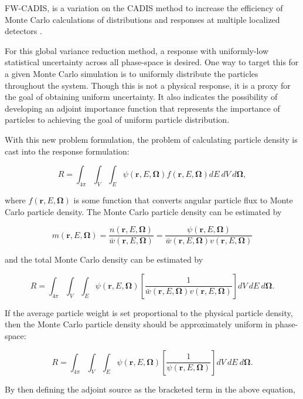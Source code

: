 \documentclass{article} %
\newcommand{\bo}{\mathbf\Omega}
\newcommand{\vecr}{\textbf{r}}
\newcommand{\fwc}{\mbox{FW-CADIS}}
\begin{document}
\fwc, is a variation on the CADIS method to increase the efficiency of Monte
Carlo calculations of distributions and responses at multiple localized
detectors \cite{fwcadis}.

For this global variance reduction method, a response with uniformly-low
statistical uncertainty across all phase-space is desired. One way to target
this for a given Monte Carlo simulation is to uniformly distribute the
particles throughout the system. Though this is not a physical response, it is
a proxy for the goal of obtaining uniform uncertainty. It also indicates the
possibility of developing an adjoint importance function that represents the
importance of particles to achieving the goal of uniform particle distribution.

With this new problem formulation, the problem of calculating particle density
is cast into the response formulation:

\begin{equation}
R = \int_{4\pi}\int_{V}\int_{E}\psi(\vecr,E,\bo)f(\vecr,E,\bo)dE\ dV\ d\bo,
\end{equation}

\noindent where $f(\vecr,E,\bo)$ is some function that converts angular
particle flux to Monte Carlo particle density. The Monte Carlo particle 
density can be estimated by

\begin{equation}
m(\vecr,E,\bo) = \frac{n(\vecr,E,\bo)}{\bar{w}(\vecr,E,\bo)} 
= \frac{\psi(\vecr,E,\bo)}{\bar{w}(\vecr,E,\bo)v(\vecr,E,\bo)}
\end{equation}

\noindent and the total Monte Carlo density can be estimated by

\begin{equation}
R = \int_{4\pi}\int_{V}\int_{E}\psi(\vecr,E,\bo)
\left[\frac{1}{\bar{w}(\vecr,E,\bo)v(\vecr,E,\bo)}\right]dV\ dE\ d\bo.
\label{eq:fwcadis_r}
\end{equation}

If the average particle weight is set proportional to the physical particle
density, then the Monte Carlo particle density should be approximately uniform
in phase-space:

\begin{equation}
R = \int_{4\pi}\int_{V}\int_{E}\psi(\vecr,E,\bo)
\left[\frac{1}{\psi(\vecr,E,\bo)}\right]dV\ dE\ d\bo.
\end{equation}

\noindent By then defining the adjoint source as the bracketed term in the
above equation,
\end{document}
